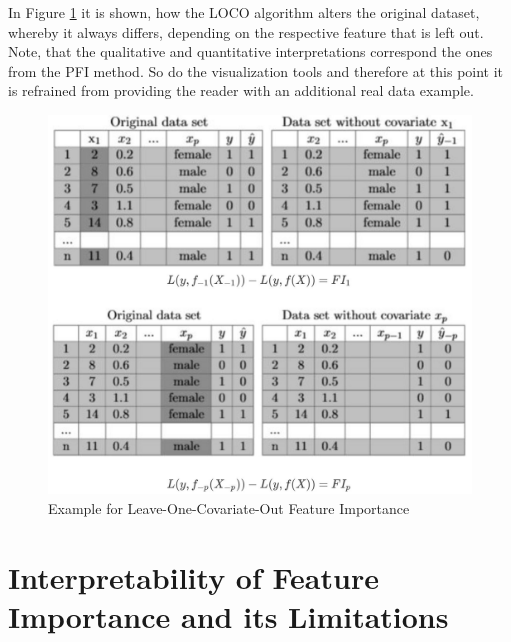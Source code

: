 \documentclass[
]{krantz}
\begin{document}
In Figure \ref{fig:LOCO} it is shown, how the LOCO algorithm alters the original dataset, whereby it always differs, depending on the respective feature that is left out. Note, that the qualitative and quantitative interpretations correspond the ones from the PFI method. So do the visualization tools and therefore at this point it is refrained from providing the reader with an additional real data example.

\begin{figure}

{\centering \includegraphics[width=0.65\linewidth]{images/LOCO_All} 

}

\caption{Example for Leave-One-Covariate-Out Feature Importance}\label{fig:LOCO}
\end{figure}

\hypertarget{interpretability-of-feature-importance-and-its-limitations}{%
\section{Interpretability of Feature Importance and its Limitations}\label{interpretability-of-feature-importance-and-its-limitations}}
\end{document}
